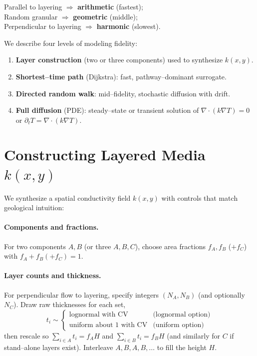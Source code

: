 \documentclass[11pt,a4paper]{article}
\begin{document}
\vspace{0.25em}
\begin{tcolorbox}[colback=blue!1!white,colframe=blue!40!black,title=The one-sentence rule]
Parallel to layering $\Rightarrow$ \textbf{arithmetic} (fastest);\\
Random granular $\Rightarrow$ \textbf{geometric} (middle);\\
Perpendicular to layering $\Rightarrow$ \textbf{harmonic} (slowest).
\end{tcolorbox}

\medskip
We describe four levels of modeling fidelity:
\begin{enumerate}
  \item \textbf{Layer construction} (two or three components) used to synthesize $k(x,y)$.
  \item \textbf{Shortest--time path} (Dijkstra): fast, pathway--dominant surrogate.
  \item \textbf{Directed random walk}: mid--fidelity, stochastic diffusion with drift.
  \item \textbf{Full diffusion} (PDE): steady--state or transient solution of $\nabla\!\cdot(k\nabla T)=0$ or $\partial_t T=\nabla\!\cdot(k\nabla T)$.
\end{enumerate}

\section{Constructing Layered Media $k(x,y)$}
We synthesize a spatial conductivity field $k(x,y)$ with controls that match geological intuition:

\paragraph{Components and fractions.} For two components $A,B$ (or three $A,B,C$), choose area fractions $f_A, f_B$ ($+f_C$) with $f_A+f_B(+f_C)=1$.

\paragraph{Layer counts and thickness.} For perpendicular flow to layering, specify integers $(N_A,N_B)$ (and optionally $N_C$). Draw raw thicknesses for each set,
\[
    t_i \sim
    \begin{cases}
        \text{lognormal with CV} & \text{(lognormal option)}\\
        \text{uniform about }1\text{ with CV} & \text{(uniform option)}
    \end{cases}
\]
then rescale so $\sum_{i\in A} t_i = f_A H$ and $\sum_{i\in B} t_i = f_B H$ (and similarly for $C$ if stand--alone layers exist). Interleave $A,B,A,B,\dots$ to fill the height $H$.
\end{document}
